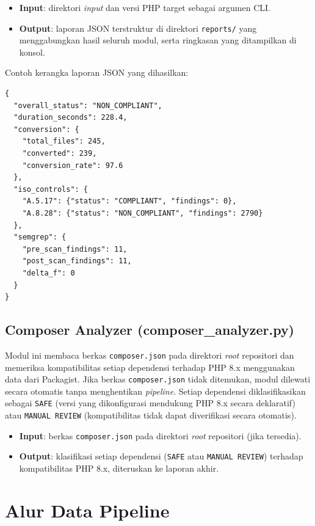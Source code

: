 \begin{itemize}
    \item \textbf{Input}: direktori \textit{input} dan versi PHP target sebagai argumen CLI.
    \item \textbf{Output}: laporan JSON terstruktur di direktori \texttt{reports/} yang menggabungkan hasil seluruh modul, serta ringkasan yang ditampilkan di konsol.
\end{itemize}

Contoh kerangka laporan JSON yang dihasilkan:

\begin{lstlisting}[style=promptstyle]
{
  "overall_status": "NON_COMPLIANT",
  "duration_seconds": 228.4,
  "conversion": {
    "total_files": 245,
    "converted": 239,
    "conversion_rate": 97.6
  },
  "iso_controls": {
    "A.5.17": {"status": "COMPLIANT", "findings": 0},
    "A.8.28": {"status": "NON_COMPLIANT", "findings": 2790}
  },
  "semgrep": {
    "pre_scan_findings": 11,
    "post_scan_findings": 11,
    "delta_f": 0
  }
}
\end{lstlisting}
\subsection{Composer Analyzer (composer\_analyzer.py)}

Modul ini membaca berkas \texttt{composer.json} pada direktori 
\textit{root} repositori dan memeriksa kompatibilitas setiap dependensi 
terhadap PHP 8.x menggunakan data dari Packagist. Jika berkas 
\texttt{composer.json} tidak ditemukan, modul dilewati secara otomatis 
tanpa menghentikan \textit{pipeline}. Setiap dependensi diklasifikasikan
sebagai \texttt{SAFE} (versi yang dikonfigurasi mendukung PHP 8.x secara
deklaratif) atau \texttt{MANUAL REVIEW} (kompatibilitas tidak dapat
diverifikasi secara otomatis).

\begin{itemize}
    \item \textbf{Input}: berkas \texttt{composer.json} pada direktori \textit{root} repositori (jika tersedia).
    \item \textbf{Output}: klasifikasi setiap dependensi (\texttt{SAFE} atau \texttt{MANUAL REVIEW}) terhadap kompatibilitas PHP 8.x, diteruskan ke laporan akhir.
\end{itemize}

\section{Alur Data Pipeline}

